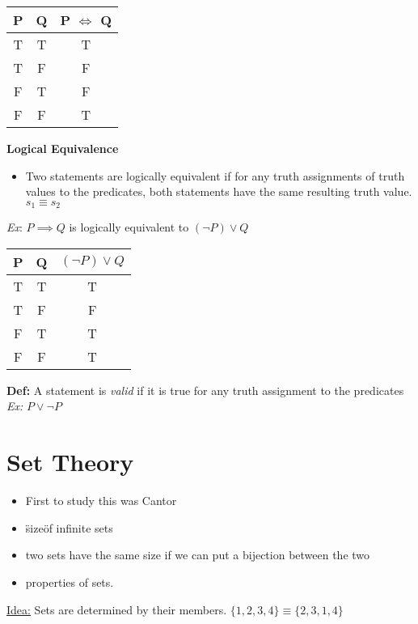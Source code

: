 \documentclass{article}
\begin{document}
    \vspace{1em}
    \begin{tabular}{c|c|c}
        P & Q & P $\iff$ Q\\
        \hline
        T & T & T \\
        T & F & F \\
        F & T & F \\
        F & F & T \\
    \end{tabular}

    \vspace{1em}
    \textbf{Logical Equivalence}
    \begin{itemize}
        \item Two statements are logically equivalent if for any truth assignments of truth values to the predicates, both statements have the same resulting truth value. $s_1 \equiv s_2$
    \end{itemize}

    \emph{Ex}: $P \implies Q$ is logically equivalent to $(\neg P ) \vee Q$

    \begin{tabular}{c|c|c}
        P & Q & $(\neg P) \vee Q$\\
        \hline
        T & T & T \\
        T & F & F \\
        F & T & T \\
        F & F & T \\
    \end{tabular}
    \vspace{1em}

    \textbf{Def:} A statement is \emph{valid} if it is true for any truth assignment to the predicates
    \emph{Ex:} $P \vee \neg P$


    \section{Set Theory}
    \begin{itemize}
        \item First to study this was Cantor
        \item \"size\" of infinite sets
        \item two sets have the same size if we can put a bijection between the two
        \item properties of sets.
    \end{itemize}

    \underline{Idea:} Sets are determined by their members. $\{1,2,3,4\} \equiv \{2,3,1,4\}$
\end{document}
